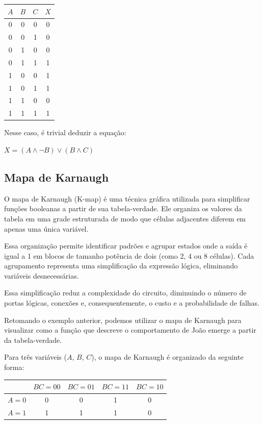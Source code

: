 \documentclass[a4paper,12pt]{article}
\begin{document}
\begin{center}
\begin{tabular}{ccc|c}
$A$ & $B$ & $C$ & $X$ \\
\hline
0 & 0 & 0 & 0 \\
0 & 0 & 1 & 0 \\
0 & 1 & 0 & 0 \\
0 & 1 & 1 & 1 \\
1 & 0 & 0 & 1 \\
1 & 0 & 1 & 1 \\
1 & 1 & 0 & 0 \\
1 & 1 & 1 & 1 \\
\end{tabular}
\end{center}

Nesse caso, é trivial deduzir a equação: 

\begin{center}
$X = (A \land \lnot{B}) \lor (B \land C)$
\end{center}

\subsection{Mapa de Karnaugh}

O mapa de Karnaugh (K-map) é uma técnica gráfica utilizada para simplificar funções booleanas a partir de sua tabela-verdade. Ele organiza os valores da tabela em uma grade estruturada de modo que células adjacentes diferem em apenas uma única variável.

Essa organização permite identificar padrões e agrupar estados onde a saída é igual a 1 em blocos de tamanho potência de dois (como 2, 4 ou 8 células). Cada agrupamento representa uma simplificação da expressão lógica, eliminando variáveis desnecessárias.

Essa simplificação reduz a complexidade do circuito, diminuindo o número de portas lógicas, conexões e, consequentemente, o custo e a probabilidade de falhas.

Retomando o exemplo anterior, podemos utilizar o mapa de Karnaugh para visualizar como a função que descreve o comportamento de João emerge a partir da tabela-verdade.

Para três variáveis ($A$, $B$, $C$), o mapa de Karnaugh é organizado da seguinte forma:

\begin{center}
\begin{tabular}{c|cccc}
 & $BC=00$ & $BC=01$ & $BC=11$ & $BC=10$ \\
\hline
$A=0$ & 0 & 0 & 1 & 0 \\
$A=1$ & 1 & 1 & 1 & 0 \\
\end{tabular}
\end{center}
\end{document}
